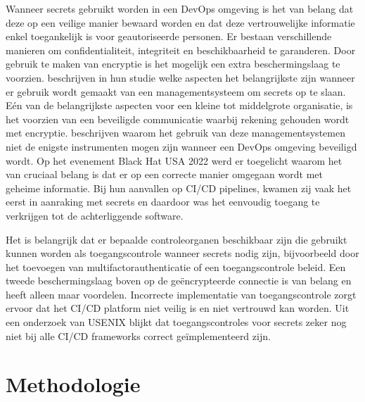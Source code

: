Wanneer secrets gebruikt worden in een \mbox{DevOps} omgeving is het van belang dat deze op een veilige manier bewaard worden en dat deze vertrouwelijke informatie enkel toegankelijk is voor geautoriseerde personen. Er bestaan verschillende manieren om confidentialiteit, integriteit en beschikbaarheid te garanderen. Door gebruik te maken van encryptie is het mogelijk een extra beschermingslaag te voorzien. \textcite{Kuzminykh2020} beschrijven in hun studie welke aspecten het belangrijkste zijn wanneer er gebruik wordt gemaakt van een managementsysteem om secrets op te slaan.  Eén van de belangrijkste aspecten voor een kleine tot middelgrote organisatie, is het voorzien van een beveiligde communicatie waarbij rekening gehouden wordt met encryptie. \autocite{AaronHaymore} beschrijven waarom het gebruik van deze managementsystemen niet de enigste instrumenten mogen zijn wanneer een \mbox{DevOps} omgeving beveiligd wordt. Op het evenement Black Hat USA 2022 \autocite{Gazdag} werd er toegelicht waarom het van cruciaal belang is dat er op een correcte manier omgegaan wordt met geheime informatie. Bij hun aanvallen op CI/CD pipelines, kwamen zij vaak het eerst in aanraking met secrets en daardoor was het eenvoudig toegang te verkrijgen tot de achterliggende software. 

Het is belangrijk dat er bepaalde controleorganen beschikbaar zijn die gebruikt kunnen worden als toegangscontrole wanneer secrets nodig zijn, bijvoorbeeld door het toevoegen van multifactorauthenticatie of een toegangscontrole beleid. Een tweede beschermingslaag boven op de geëncrypteerde connectie is van belang en heeft alleen maar voordelen. Incorrecte implementatie van toegangscontrole zorgt ervoor dat het CI/CD platform niet veilig is en niet vertrouwd kan worden. Uit een onderzoek van USENIX \autocite{Koishybayev2022} blijkt dat toegangscontroles voor secrets zeker nog niet bij alle CI/CD frameworks correct geïmplementeerd zijn.




\section{Methodologie}%
\label{sec:methodologie}

